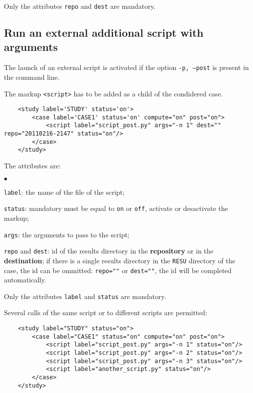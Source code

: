 \documentclass[a4paper,10pt,twoside]{article}
\begin{document}
Only the attributes \texttt{repo} and \texttt{dest} are mandatory.

\subsection{Run an external additional script with arguments}

The launch of an external script is activated if the option \texttt{-p, --post} is present in the command line.

The markup \texttt{<script>} has to be added as a child of the condidered case.

\begin{verbatim}
    <study label='STUDY' status='on'>
        <case label='CASE1' status='on' compute="on" post="on">
            <script label="script_post.py" args="-n 1" dest="" repo="20110216-2147" status="on"/>
        </case>
    </study>
\end{verbatim}

The attributes are:
\begin{list}{$\bullet$}{}
\item \texttt{label}: the name of the file of the script;
\item \texttt{status}: mandatory must be equal to \texttt{on} or \texttt{off},
activate or desactivate the markup;
\item \texttt{args}: the arguments to pass to the script;
\item \texttt{repo} and \texttt{dest}: id of the results directory in the \textbf{repository} or
in the \textbf{destination}; if there is a single results directory in the \texttt{RESU} directory
of the case, the id can be ommitted: \texttt{repo=""} or \texttt{dest=""}, the id will be completed
automatically.
\end{list}

Only the attributes \texttt{label} and \texttt{status} are mandatory.

Several calls of the same script or to different scripts are permitted:
\begin{verbatim}
    <study label="STUDY" status="on">
        <case label="CASE1" status="on" compute="on" post="on">
            <script label="script_post.py" args="-n 1" status="on"/>
            <script label="script_post.py" args="-n 2" status="on"/>
            <script label="script_post.py" args="-n 3" status="on"/>
            <script label="another_script.py" status="on"/>
        </case>
    </study>
\end{verbatim}
\end{document}

